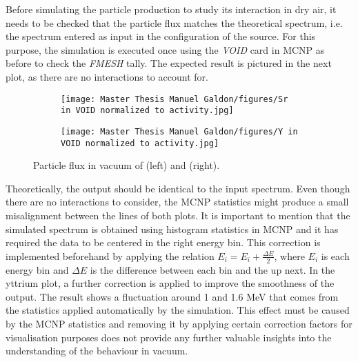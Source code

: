 Before simulating the particle production to study its interaction in dry air, it needs to be checked that the particle flux matches the theoretical spectrum, i.e. the spectrum entered as input in the configuration of the source. For this purpose, the simulation is executed once using the \emph{VOID} card in MCNP as before to check the \emph{FMESH} tally. The expected result is pictured in the next plot, as there are no interactions to account for.
\clearpage
\begin{figure}[!h]
    \begin{subfigure}{7 cm}
        \texttt{[image: Master Thesis Manuel Galdon/figures/Sr in VOID normalized to activity.jpg]} 
        \label{fig:Sr-90_VOID}
    \end{subfigure}
    \hspace{1cm}
    \begin{subfigure}{1 cm}
        \texttt{[image: Master Thesis Manuel Galdon/figures/Y in VOID normalized to activity.jpg]}
        \label{fig:Y-90_VOID}
    \end{subfigure}
    \caption{Particle flux in vacuum of  (left) and  (right).}
    \label{fig:particle_flux_VOID_Sr_and_Y}
\end{figure}

Theoretically, the output should be identical to the input spectrum. Even though there are no interactions to consider, the MCNP statistics might produce a small misalignment between the lines of both plots. It is important to mention that the simulated spectrum is obtained using histogram statistics in MCNP and it has required the data to be centered in the right energy bin. This correction is implemented beforehand by applying the relation $E_i = E_i + \frac{\Delta E}{2}$, where $E_i$ is each energy bin and $\Delta E$ is the difference between each bin and the up next. In the yttrium plot, a further correction is applied to improve the smoothness of the output. The result shows a fluctuation around 1 and 1.6 \unit{\mega\electronvolt} that comes from the statistics applied automatically by the simulation. This effect must be caused by the MCNP statistics and removing it by applying certain correction factors for visualisation purposes does not provide any further valuable insights into the understanding of the behaviour in vacuum.

